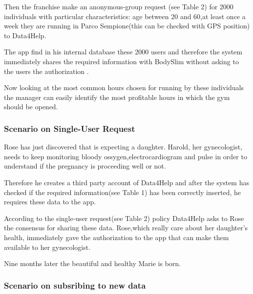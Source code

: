 Then the franchise make an anonymous-group request (see Table 2) for 2000 individuals with particular characteristics: age between 20 and 60,at least once a week they are running in Parco Sempione(this can be checked with GPS position) to Data4Help. 

The app find in his internal database these 2000 users and therefore the system immediately shares the required information with BodySlim without asking to the users the authorization .

Now looking at the most common hours chosen for running by these individuals the manager can easily identify the most profitable hours in which the gym should be opened.


    \subsubsection{Scenario on Single-User Request}

    Rose has just discovered that is expecting a daughter. Harold, her gynecologist, needs to keep monitoring bloody ossygen,electrocardiogram and pulse in order to understand if the pregnancy is proceeding well or not. 

Therefore he creates a third party account of Data4Help and after the system has checked if the required information(see Table 1) has been correctly inserted, he requires these data to the app. 

According to the single-user request(see Table 2)  policy Data4Help asks to Rose the consensus for sharing these data. Rose,which really care about her daughter's health, immediately gave the authorization to the app that can make them available to her gynecologist.

 Nine months later the beautiful and healthy Marie is born.

    \subsubsection{Scenario on subsribing to new data}

